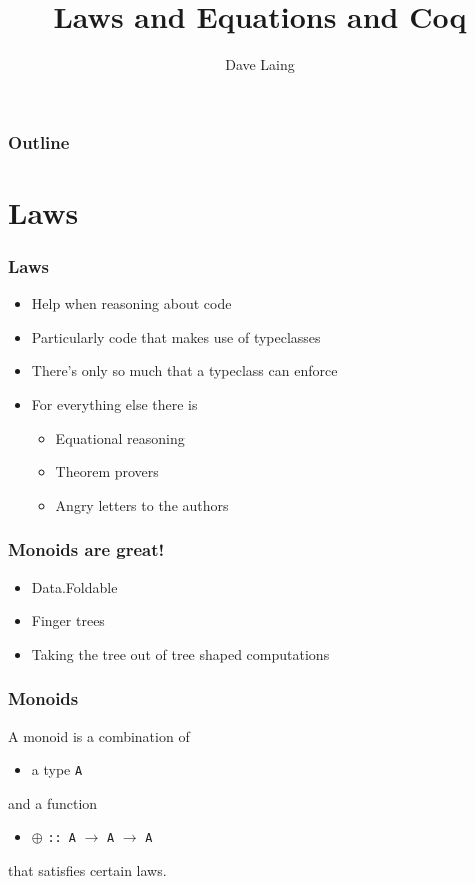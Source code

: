 \documentclass{beamer}
\title{Laws and Equations and Coq}
\author{Dave Laing}
\begin{document}
\begin{frame}
    \titlepage
\end{frame}

\begin{frame}
    \frametitle{Outline}
    \tableofcontents[pausesections]
\end{frame}

\section{Laws}

\begin{frame}
    \frametitle {Laws}

\begin{itemize}
\item Help when reasoning about code
\item Particularly code that makes use of typeclasses
\item There's only so much that a typeclass can enforce
\item For everything else there is
    \begin{itemize}
        \item Equational reasoning
        \item Theorem provers
        \item Angry letters to the authors
    \end{itemize}
\end{itemize}

\end{frame}

\begin{frame}
    \frametitle {Monoids are great!}
\begin{itemize}
\item Data.Foldable
\item Finger trees
\item Taking the tree out of tree shaped computations
\end{itemize}
\end{frame}

\begin{frame}[fragile]
    \frametitle {Monoids}

A monoid is a combination of 
\begin{itemize}
\item a type \verb?A?
\end{itemize}
and a function
\begin{itemize}
\item $\oplus$ \verb?:: A? $\rightarrow$ \verb?A? $\rightarrow$ \verb?A? 
\end{itemize}
that satisfies certain laws.

\end{frame}
\end{document}
